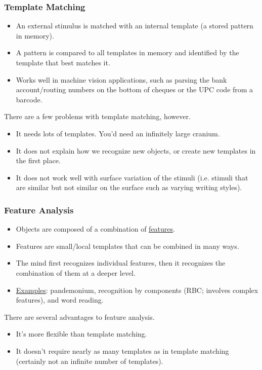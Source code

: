 \documentclass[]{article}
\begin{document}
			\subsubsection{Template Matching}
				\begin{itemize}
					\item An external stimulus is matched with an internal template (a stored pattern in memory).
					\item A pattern is compared to all templates in memory and identified by the template that best matches it.
					\item Works well in machine vision applications, such as parsing the bank account/routing numbers on the bottom of cheques or the UPC code from a barcode.
				\end{itemize}

				There are a few problems with template matching, however.
				\begin{itemize}
					\item It needs lots of templates. You'd need an infinitely large cranium.
					\item It does not explain how we recognize new objects, or create new templates in the first place.
					\item It does not work well with surface variation of the stimuli (i.e. stimuli that are similar but not similar on the surface \textendash{} such as varying writing styles).
				\end{itemize}

			\subsubsection{Feature Analysis}
				\begin{itemize}
					\item Objects are composed of a combination of \underline{features}.
					\item Features are small/local templates that can be combined in many ways.
					\item The mind first recognizes individual features, then it recognizes the combination of them at a deeper level.
					\item \underline{Examples}: pandemonium, recognition by components (RBC; involves complex features), and word reading.
				\end{itemize}

				There are several advantages to feature analysis.
				\begin{itemize}
					\item It's more flexible than template matching.
					\item It doesn't require nearly as many templates as in template matching (certainly not an infinite number of templates).
				\end{itemize}
\end{document}
